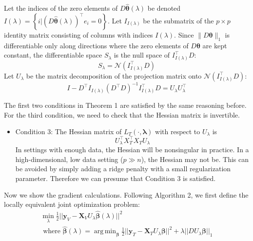 \documentclass[10pt,letterpaper]{article}
\DeclareMathOperator*{\argmin}{arg\,min}
\begin{document}
Let the indices of the zero elements of $D \hat{\boldsymbol{\theta}}(\lambda)$ be denoted $I(\lambda) = \left \{i | (D \hat{\boldsymbol{\theta}}(\lambda))^\top e_i = 0 \right \}$.
Let $I_{I(\lambda)}$ be the submatrix of the $p \times p$ identity matrix consisting of columns with indices $I(\lambda)$. Since $\|D \boldsymbol{\theta}\|_1$ is differentiable only along directions where the zero elements of $D \boldsymbol{\theta}$ are kept constant, the differentiable space $S_\lambda$ is the null space of $I_{I(\lambda)}^\top D$:
\begin{equation}
S_\lambda = \mathcal{N}(I_{I(\lambda)}^\top D)
\end{equation}
Let $U_\lambda$ be the matrix decomposition of the projection matrix onto $\mathcal{N}(I_{I(\lambda)}^\top D)$:
\begin{equation}
I - D^\top I_{I(\lambda)} \left ( D^\top D\right )^{-1} I_{I(\lambda)}^\top D = U_\lambda U_\lambda^\top
\end{equation}

The first two conditions in Theorem 1 are satisfied by the same reasoning before. For the third condition, we need to check that the Hessian matrix is invertible.
\begin{itemize}
\item[] Condition 3: The Hessian matrix of $L_T(\cdot, \boldsymbol{\lambda})$ with respect to $U_\lambda$ is
\begin{equation}
U_\lambda^\top X_T^\top X_T U_\lambda
\end{equation}
In settings with enough data, the Hessian will be nonsingular in practice. In a high-dimensional, low data setting ($p \gg n$), the Hessian may not be. This can be avoided by simply adding a ridge penalty with a small regularization parameter. Therefore we can presume that Condition 3 is satisfied.
\end{itemize}

Now we show the gradient calculations. Following Algorithm 2, we first define the locally equivalent joint optimization problem:
\begin{equation}
\begin{array}{c}
\min_{\lambda} \frac{1}{2} \lvert\lvert \boldsymbol{y}_V - \boldsymbol{X}_V U_\lambda \hat{\boldsymbol{\beta}} (\lambda) \rvert\rvert ^2 \\
\text{ where }
\hat{\boldsymbol{\beta}} (\lambda) =
\argmin_{\boldsymbol{\beta}}
\frac{1}{2} \lvert\lvert \boldsymbol{y}_T - \boldsymbol{X}_T U_\lambda \boldsymbol{\beta} \rvert\rvert ^2
+ \lambda \lvert\lvert D U_\lambda \boldsymbol{\beta} \rvert \rvert_1
\end{array}
\label{genlassoeasy}
\end{equation}
\end{document}
